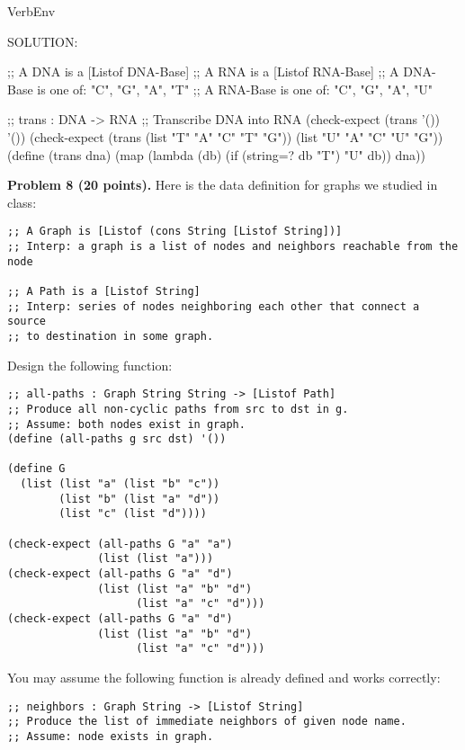 \documentclass[12pt]{article}
\begin{document}
\begin{SaveVerbatim}{VerbEnv}


SOLUTION:

;; A DNA is a [Listof DNA-Base]
;; A RNA is a [Listof RNA-Base]
;; A DNA-Base is one of: "C", "G", "A", "T"
;; A RNA-Base is one of: "C", "G", "A", "U"

;; trans : DNA -> RNA
;; Transcribe DNA into RNA
(check-expect (trans '()) '())
(check-expect (trans (list "T" "A" "C" "T" "G"))
              (list "U" "A" "C" "U" "G"))
(define (trans dna)
  (map (lambda (db) (if (string=? db "T") "U" db)) dna))    
\end{SaveVerbatim}



\newpage


\noindent
{\bf Problem 8 (20 points).} Here is the data definition for graphs we studied in class:
\begin{verbatim}
;; A Graph is [Listof (cons String [Listof String])]
;; Interp: a graph is a list of nodes and neighbors reachable from the node

;; A Path is a [Listof String]
;; Interp: series of nodes neighboring each other that connect a source
;; to destination in some graph.
\end{verbatim}

\noindent
Design the following function:

\begin{verbatim}
;; all-paths : Graph String String -> [Listof Path]
;; Produce all non-cyclic paths from src to dst in g.
;; Assume: both nodes exist in graph.
(define (all-paths g src dst) '())

(define G
  (list (list "a" (list "b" "c"))
        (list "b" (list "a" "d"))
        (list "c" (list "d"))))

(check-expect (all-paths G "a" "a")
              (list (list "a")))
(check-expect (all-paths G "a" "d")
              (list (list "a" "b" "d")
                    (list "a" "c" "d")))
(check-expect (all-paths G "a" "d")
              (list (list "a" "b" "d")
                    (list "a" "c" "d")))
\end{verbatim}

\noindent
You may assume the following function is already defined and works correctly:

\begin{verbatim}
;; neighbors : Graph String -> [Listof String]
;; Produce the list of immediate neighbors of given node name.
;; Assume: node exists in graph.
\end{verbatim}
\end{document}

